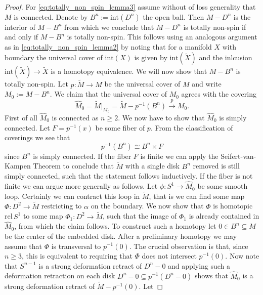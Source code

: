 \begin{proof}
    For \ref{eq:totally_non_spin_lemma3} assume without of loss generality that $M$ is connected. Denote by $B^n := \mathrm{int}(D^n)$ the open ball. Then $M - D^n$ is the interior of $M - B^n$ 
    from which we conclude that $M - D^n$ is totally non-spin if and only if $M- B^n$ is totally non-spin. This follows using an analogous argument as in \ref{eq:totally_non_spin_lemma2} by noting that for a manifold $X$ with boundary the universal cover of $\mathrm{int}(X)$ is given by $\mathrm{int}(\tilde{X})$ and the inlcusion $\mathrm{int}(\tilde{X}) \to \tilde{X}$ is a homotopy equivalence. We will now show that $M - B^n$ is totally non-spin. Let $p \colon \tilde{M} \to M$ be the universal cover of $M$ and write $M_0 := M - B^n$. We claim that the universal cover of $M_0$ agrees with the covering 
    \[
    \hat{M}_0 = \tilde{M}|_{M_0} = \tilde{M} - p^{-1}(B^n) \xrightarrow{p} M_0.
    \]
    First of all $\hat{M}_0$ is connected as $n \geq 2$. We now have to show that $\hat{M}_0$ is simply connected. Let $F = p^{-1}(x)$ be some fiber of $p$. From the classification of coverings we see that 
    \[
    p^{-1}(B^n) \cong B^n \times F
    \]
    since $B^n$ is simply connected. If the fiber $F$ is finite we can apply the Seifert-van-Kampen Theorem to conclude that $\tilde{M}$ with a single disk $B^n$ removed is still simply connected, such that the statement follows inductively. If the fiber is not finite we can argue more generally as follows. Let $\phi \colon S^1 \to \hat{M}_0$ be some smooth loop. Certainly we can contract this loop in $\tilde{M}$, that is we can find some map $\Phi \colon D^2 \to \tilde{M}$ restricting to $\alpha$ on the boundary. We now show that $\Phi$ is homotopic rel$\,S^1$ to some map $\Phi_1 \colon D^2 \to \tilde{M}$, such that the image of $\Phi_1$ is already contained in $\hat{M}_0$, from which the claim follows. To construct such a homotopy let $0 \in B^n \subseteq M$ be the center of the embedded disk. After a preliminary homotopy we may assume that $\Phi$ is transversal to $p^{-1}(0)$. The crucial observation is that, since $n \geq 3$, this is equivalent to requiring that $\Phi$ does not intersect $p^{-1}(0)$. Now note that $S^{n-1}$ is a strong deformation retract of $D^n - 0$ and applying such a deformation retraction on each disk $D^n - 0 \subseteq p^{-1}(D^n - 0)$ shows that $\hat{M}_0$ is a strong deformation retract of $\tilde{M} - p^{-1}(0)$. Let 

\end{proof}
